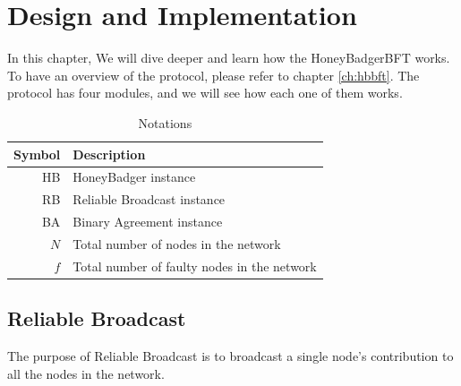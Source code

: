 
\chapter{Design and Implementation}
\label{ch:impl}
In this chapter, We will dive deeper and learn how the HoneyBadgerBFT works. To have an overview of the protocol, please refer to chapter \ref{ch:hbbft}.
The protocol has four modules, and we will see how each one of them works.

 \begin{table}[!h]
 \centering
\begin{tabular}{ |r|  l| }
\hline
 \textbf{Symbol}& \textbf{Description}  \\
 \hline
HB & HoneyBadger instance\\
RB & Reliable Broadcast instance\\
BA & Binary Agreement instance\\
$N$ & Total number of nodes in the network\\
$f$ & Total number of faulty nodes in the network\\
  \hline
\end{tabular}


  \caption{Notations}
  \end{table}
\section{Reliable Broadcast}
The purpose of Reliable Broadcast is to broadcast a single node’s contribution to all the nodes in the network.

